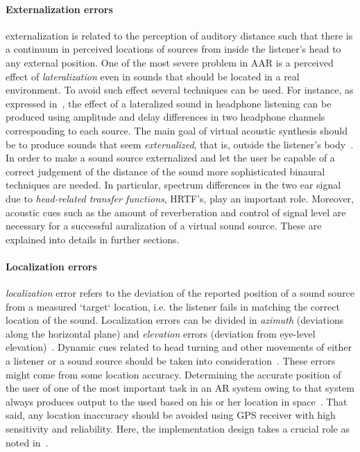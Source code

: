 \documentclass[journal]{IEEEtran}
\begin{document}
\paragraph{Externalization errors}
externalization is related to the perception of auditory distance such that there is a continuum in perceived locations of sources from inside the listener's head to any external position. One of the most severe problem in AAR is a perceived effect of \emph{lateralization} even in sounds that should be located in a real environment. To avoid such effect several techniques can be used. For instance, as expressed in~\cite{}, the effect of a lateralized sound in headphone listening can be produced using amplitude and delay differences in two headphone channels corresponding to each source. The main goal of virtual acoustic synthesis should be to produce sounds that seem \emph{externalized}, that is, outside the listener's body~\cite{}. In order to make a sound source externalized and let the user be capable of a correct judgement of the distance of the sound more sophisticated binaural techniques are needed. In particular, spectrum differences in the two ear signal due to \emph{head-related transfer functions}, HRTF's, play an important role. Moreover, acoustic cues such as the amount of reverberation and control of signal level are necessary for a successful auralization of a virtual sound source. These are explained into details in further sections.
\paragraph{Localization errors}
\emph{localization} error refers to the deviation of the reported position of a sound source from a measured `target` location, i.e. the listener fails in matching the correct location of the sound. Localization errors can be divided in \emph{azimuth} (deviations along the horizontal plane) and \emph{elevation} errors (deviation from eye-level elevation)~\cite{}. Dynamic cues related to head turning and other movements of either a listener or a sound source should be taken into consideration~\cite{}. These errors might come from some location accuracy. Determining the accurate position of the user of one of the most important task in an AR system owing to that system always produces output to the used based on his or her location in space~\cite{}. That said, any location inaccuracy should be avoided using GPS receiver with high sensitivity and reliability. Here, the implementation design takes a crucial role as noted in~\cite{}.
\end{document}
